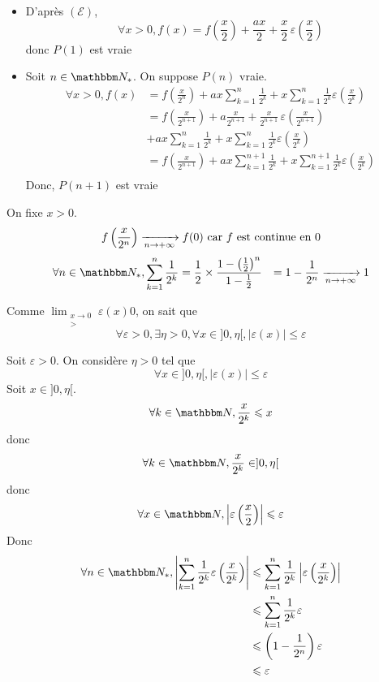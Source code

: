 \begin{itemize}
	\item D'après $(\mathcal{E})$, \[
			\forall x>0, f(x) = f\left( \frac{x}{2} \right)  + \frac{ax}{2} + \frac{x}{2}\, \varepsilon\left( \frac{x}{2} \right)
		\] donc $P(1)$ est vraie
	\item Soit $n\in \N_*$. On suppose $P(n)$ vraie.
		\begin{align*}
			\forall x >0,
			f(x) &= f\left( \frac{x}{2^n} \right) + ax\sum_{k=1}^n \frac{1}{2^k} +x\sum_{k=1}^n \frac{1}{2^k} \varepsilon\left( \frac{x}{2^k} \right)\\
			&= f\left( \frac{x}{2^{n+1}} \right) + a \frac{x}{2^{n+1}} + \frac{x}{2^{n+1}}\, \varepsilon\left( \frac{x}{2^{n+1}} \right) \\
			&+ ax \sum_{k=1}^n \frac{1}{2^k} + x\sum_{k=1}^n \frac{1}{2^k} \varepsilon\left( \frac{x}{2^k} \right) \\
			&= f\left( \frac{x}{2^{n+1}} \right) + ax\sum_{k=1}^{n+1}\frac{1}{2^k} + x\sum_{k=1}^{n+1} \frac{1}{2^{k}} \varepsilon\left( \frac{x}{2^k} \right) \\
		\end{align*}
		Donc, $P(n+1)$ est vraie
\end{itemize}

On fixe $x > 0$. \[
	f\left( \frac{x}{2^n} \right) \xrightarrow[n\to +\infty]{} f(0) \text{ car $f$ est continue en $0$}
\] 
\begin{align*}
	\forall n \in \N_*, \sum_{k=1}^n \frac{1}{2^k} &= \frac{1}{2} \times  \frac{1- \left( \frac{1}{2} \right)^n}{1 - \frac{1}{2}}
	&= 1 - \frac{1}{2^n} \tendsto{n \to +\infty} 1 \\
\end{align*}

Comme $\lim_{\substack{x\to 0\\>}} \varepsilon(x)  0$, on sait que \[
	\forall \varepsilon >0, \exists \eta > 0, \forall x \in ]0,\eta[, \left| \varepsilon(x) \right| \le \varepsilon
\]

Soit $\varepsilon>0$. On considère $\eta>0$ tel que \[
	\forall x \in ]0,\eta[, \left| \varepsilon(x) \right| \le \varepsilon
\]
Soit $x \in ]0,\eta[$. \[
	\forall k \in \N, \frac{x}{2^k} \le x
\] donc \[
	\forall k \in \N, \frac{x}{2^k} \in ]0,\eta[
\] donc \[
	\forall x \in \N, \left| \varepsilon\left( \frac{x}{2} \right)  \right| \le \varepsilon
\]  Donc 
\begin{align*}
	\forall n \in \N_*, \left| \sum_{k=1}^n \frac{1}{2^k}\varepsilon\left( \frac{x}{2^k} \right) \right|
	&\le \sum_{k=1}^n \frac{1}{2^k} \left| \varepsilon\left( \frac{x}{2^k} \right) \right|\\
	&\le  \sum_{k=1}^n \frac{1}{2^k} \varepsilon\\
	&\le \left( 1 - \frac{1}{2^n} \right) \varepsilon\\
	&\le \varepsilon
\end{align*}

